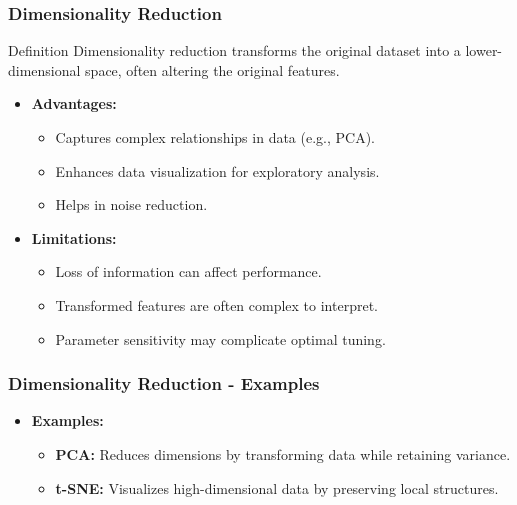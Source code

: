 \documentclass{beamer}
\begin{document}
\begin{frame}[fragile]
    \frametitle{Dimensionality Reduction}
    \begin{block}{Definition}
        Dimensionality reduction transforms the original dataset into a lower-dimensional space, often altering the original features.
    \end{block}
    \begin{itemize}
        \item \textbf{Advantages:}
            \begin{itemize}
                \item Captures complex relationships in data (e.g., PCA).
                \item Enhances data visualization for exploratory analysis.
                \item Helps in noise reduction.
            \end{itemize}
        \item \textbf{Limitations:}
            \begin{itemize}
                \item Loss of information can affect performance.
                \item Transformed features are often complex to interpret.
                \item Parameter sensitivity may complicate optimal tuning.
            \end{itemize}
    \end{itemize}
\end{frame}

\begin{frame}[fragile]
    \frametitle{Dimensionality Reduction - Examples}
    \begin{itemize}
        \item \textbf{Examples:}
            \begin{itemize}
                \item \textbf{PCA:} Reduces dimensions by transforming data while retaining variance.
                \item \textbf{t-SNE:} Visualizes high-dimensional data by preserving local structures.
            \end{itemize}
    \end{itemize}
\end{frame}
\end{document}
